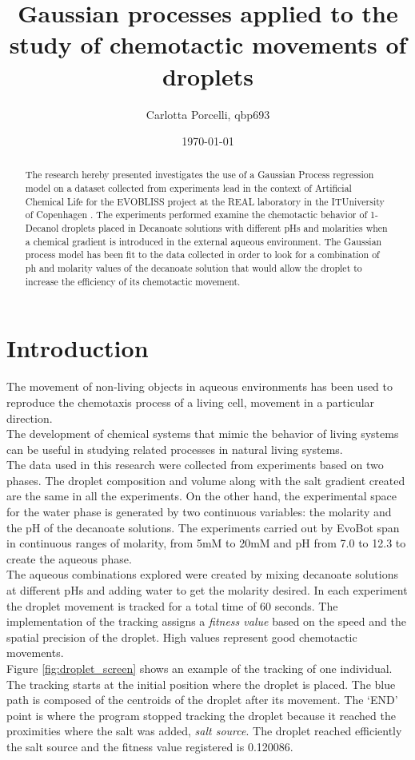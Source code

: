 \documentclass[a4paper]{article}
\title{Gaussian processes applied to the study of chemotactic movements of droplets}
\author{Carlotta Porcelli, qbp693}
\date{\today}
\begin{document}
\maketitle

\begin{abstract}
The research hereby presented investigates the use of a Gaussian Process regression model on a dataset collected from experiments lead in the context of Artificial Chemical Life for the EVOBLISS project \cite{evobliss} at the REAL laboratory in the ITUniversity of Copenhagen \cite{itu_real} . 
The experiments performed examine the chemotactic behavior of 1-Decanol droplets placed in Decanoate solutions with different pHs and molarities when a chemical gradient is introduced in the external aqueous environment.
The Gaussian process model has been fit to the data collected in order to look for a combination of ph and molarity values of the decanoate solution that would allow the droplet to increase the efficiency of its chemotactic movement. 
\end{abstract}

\section{Introduction}
The movement of non-living objects in aqueous environments has been used to reproduce the chemotaxis process of a living cell, movement in a particular direction. \cite{ikea} 
\\The development of chemical systems that mimic the behavior of living systems can be useful in studying related processes in natural living systems.
\\The data used in this research were collected from experiments based on two phases. The droplet composition and volume along with the salt gradient created are the same in all the experiments. On the other hand, the experimental space for the water phase is generated by two continuous variables: the molarity and the pH of the decanoate solutions. The experiments carried out by EvoBot \cite{evobot} span in continuous ranges of molarity, from 5mM to 20mM and pH from 7.0 to 12.3 to create the aqueous phase.
\\The aqueous combinations explored were created by mixing decanoate solutions at different pHs and adding water to get the molarity desired.
In each experiment the droplet movement is tracked for a total time of 60 seconds. The implementation of the tracking assigns a \textit{fitness value} based on the speed and the spatial precision of the droplet. High values represent good chemotactic movements.
\\ Figure \ref{fig:droplet_screen} shows an example of the tracking of one individual. The tracking starts at the initial position where the droplet is placed. The blue path is composed of the centroids of the droplet after its movement. 
\newpage
The ‘END’ point is where the program stopped tracking the droplet because it reached the proximities where the salt was added, \textit{salt source}. The droplet reached efficiently the salt source and the fitness value registered is 0.120086. 
\end{document}
